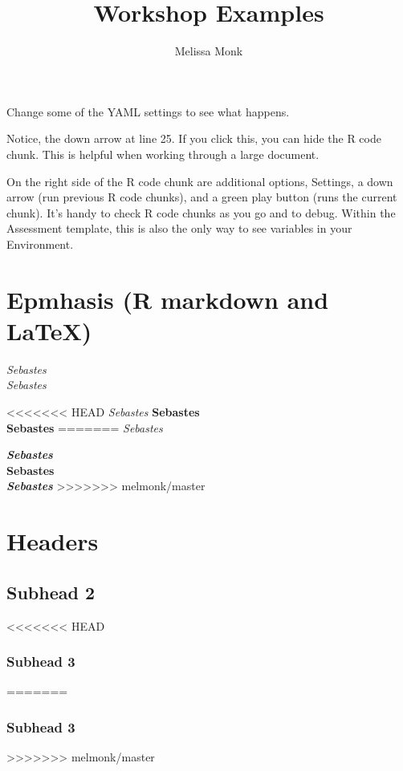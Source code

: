 \documentclass[12pt,]{article}
\title{Workshop Examples}
\author{Melissa Monk}
\date{}
\begin{document}
\maketitle

{
\setcounter{tocdepth}{4}
\tableofcontents
}
Change some of the YAML settings to see what happens.

Notice, the down arrow at line 25. If you click this, you can hide the R
code chunk. This is helpful when working through a large document.

On the right side of the R code chunk are additional options, Settings,
a down arrow (run previous R code chunks), and a green play button (runs
the current chunk). It's handy to check R code chunks as you go and to
debug. Within the Assessment template, this is also the only way to see
variables in your Environment.

\section{Epmhasis (R markdown and
LaTeX)}\label{epmhasis-r-markdown-and-latex}

\emph{Sebastes}\\
\emph{Sebastes}

<<<<<<< HEAD
\emph{Sebastes} \textbf{Sebastes}\\
\textbf{Sebastes}
=======
\emph{Sebastes}

\textbf{\emph{Sebastes}}\\
\textbf{Sebastes}\\
\emph{\textbf{Sebastes}}
>>>>>>> melmonk/master

\section{Headers}\label{headers}

\subsection{Subhead 2}\label{subhead-2}

<<<<<<< HEAD
\subsubsection*{Subhead 3}\label{subhead-3}
=======
\subsubsection{Subhead 3}\label{subhead-3}
>>>>>>> melmonk/master
\end{document}
